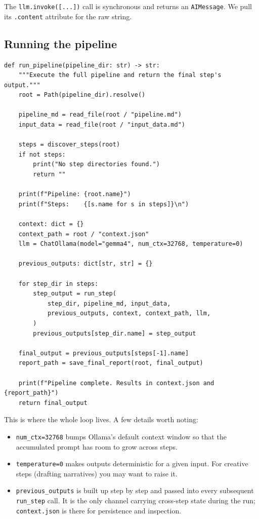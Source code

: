 \documentclass[12pt, a4paper]{article}
\begin{document}
The \texttt{llm.invoke([...])} call is synchronous and returns an \texttt{AIMessage}. We pull its \texttt{.content} attribute for the raw string.

\subsection{Running the pipeline}

\begin{lstlisting}[style=pythonstyle]
def run_pipeline(pipeline_dir: str) -> str:
    """Execute the full pipeline and return the final step's output."""
    root = Path(pipeline_dir).resolve()

    pipeline_md = read_file(root / "pipeline.md")
    input_data = read_file(root / "input_data.md")

    steps = discover_steps(root)
    if not steps:
        print("No step directories found.")
        return ""

    print(f"Pipeline: {root.name}")
    print(f"Steps:    {[s.name for s in steps]}\n")

    context: dict = {}
    context_path = root / "context.json"
    llm = ChatOllama(model="gemma4", num_ctx=32768, temperature=0)

    previous_outputs: dict[str, str] = {}

    for step_dir in steps:
        step_output = run_step(
            step_dir, pipeline_md, input_data,
            previous_outputs, context, context_path, llm,
        )
        previous_outputs[step_dir.name] = step_output

    final_output = previous_outputs[steps[-1].name]
    report_path = save_final_report(root, final_output)

    print(f"Pipeline complete. Results in context.json and {report_path}")
    return final_output
\end{lstlisting}

This is where the whole loop lives. A few details worth noting:

\begin{itemize}[leftmargin=1.5em]
  \item \texttt{num\_ctx=32768} bumps Ollama's default context window so that the accumulated prompt has room to grow across steps.
  \item \texttt{temperature=0} makes outputs deterministic for a given input. For creative steps (drafting narratives) you may want to raise it.
  \item \texttt{previous\_outputs} is built up step by step and passed into every subsequent \texttt{run\_step} call. It is the only channel carrying cross-step state during the run; \texttt{context.json} is there for persistence and inspection.
\end{itemize}
\end{document}
